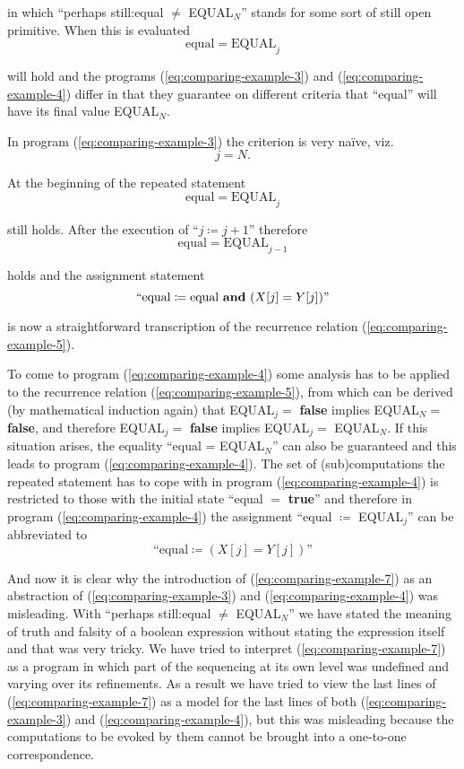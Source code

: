 \noindent
in which ``perhaps still:equal $\neq$ EQUAL$_N$'' stands for some sort of still open primitive. When this is evaluated
$$
\text{equal} = \text{EQUAL}_j
$$

\noindent
will hold and the programs (\ref{eq:comparing-example-3}) and (\ref{eq:comparing-example-4}) differ in that they guarantee on different criteria that ``equal'' will have its final value EQUAL$_N$.

In program (\ref{eq:comparing-example-3}) the criterion is very naïve, viz.
$$
j = N.
$$

\noindent
At the beginning of the repeated statement
$$
\text{equal} = \text{EQUAL}_j
$$

\noindent
still holds. After the execution of ``$j \coloneq j + 1$'' therefore
$$
\text{equal} = \text{EQUAL}_{j-1}
$$

\noindent
holds and the assignment statement
$$
\text{``equal} \coloneq \text{equal \textbf{and} } (X[j] = Y[j])\text{''}
$$

\noindent
is now a straightforward transcription of the recurrence relation (\ref{eq:comparing-example-5}).

To come to program (\ref{eq:comparing-example-4}) some analysis has to be applied to the recurrence relation (\ref{eq:comparing-example-5}), from which can be derived (by mathematical induction again) that EQUAL$_j =$ \textbf{false} implies EQUAL$_N =$ \textbf{false}, and therefore EQUAL$_j =$ \textbf{false} implies EQUAL$_j =$ EQUAL$_N$. If this situation arises, the equality ``equal = EQUAL$_N$'' can also be guaranteed and this leads to program (\ref{eq:comparing-example-4}). The set of (sub)computations the repeated statement has to cope with in program (\ref{eq:comparing-example-4}) is restricted to those with the initial state ``equal $=$ \textbf{true}'' and therefore in program (\ref{eq:comparing-example-4}) the assignment ``equal $\coloneq$ EQUAL$_j$'' can be abbreviated to
$$
\text{``equal} \coloneq (X[j] = Y[j])\text{''}
$$

And now it is clear why the introduction of (\ref{eq:comparing-example-7}) as an abstraction of (\ref{eq:comparing-example-3}) and (\ref{eq:comparing-example-4}) was misleading. With ``perhaps still:equal $\neq$ EQUAL$_N$'' we have stated the meaning of truth and falsity of a boolean expression without stating the expression itself and that was very tricky. We have tried to interpret (\ref{eq:comparing-example-7}) as a program in which part of the sequencing at its own level was undefined and varying over its refinements. As a result we have tried to view the last lines of (\ref{eq:comparing-example-7}) as a model for the last lines of both (\ref{eq:comparing-example-3}) and (\ref{eq:comparing-example-4}), but this was misleading because the computations to be evoked by them cannot be brought into a one-to-one correspondence.

